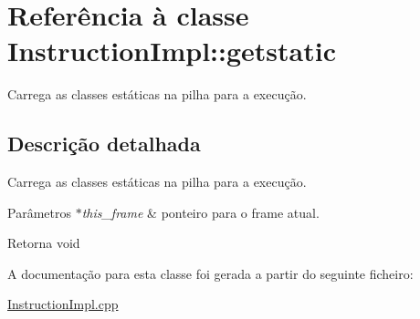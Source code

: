 \hypertarget{class_instruction_impl_1_1getstatic}{}\section{Referência à classe Instruction\+Impl\+:\+:getstatic}
\label{class_instruction_impl_1_1getstatic}


Carrega as classes estáticas na pilha para a execução.  




\subsection{Descrição detalhada}
Carrega as classes estáticas na pilha para a execução. 


\begin{DoxyParams}{Parâmetros}
{\em $\ast$this\+\_\+frame} & ponteiro para o frame atual. \\
\hline
\end{DoxyParams}
\begin{DoxyReturn}{Retorna}
void 
\end{DoxyReturn}


A documentação para esta classe foi gerada a partir do seguinte ficheiro\+:\begin{DoxyCompactItemize}
\item 
\hyperlink{_instruction_impl_8cpp}{Instruction\+Impl.\+cpp}\end{DoxyCompactItemize}
